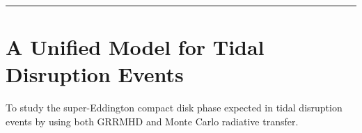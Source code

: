 \documentclass[onecolumn]{aastex63}
\begin{document}

\vspace{1cm}
\hrule
\vspace{1cm}

\section{A Unified Model for Tidal Disruption Events}
\begin{centering}

\cite{dai2018}

\end{centering}



To study the super-Eddington compact disk phase expected in tidal disruption events by using both GRRMHD and Monte Carlo radiative transfer.


\end{document}
